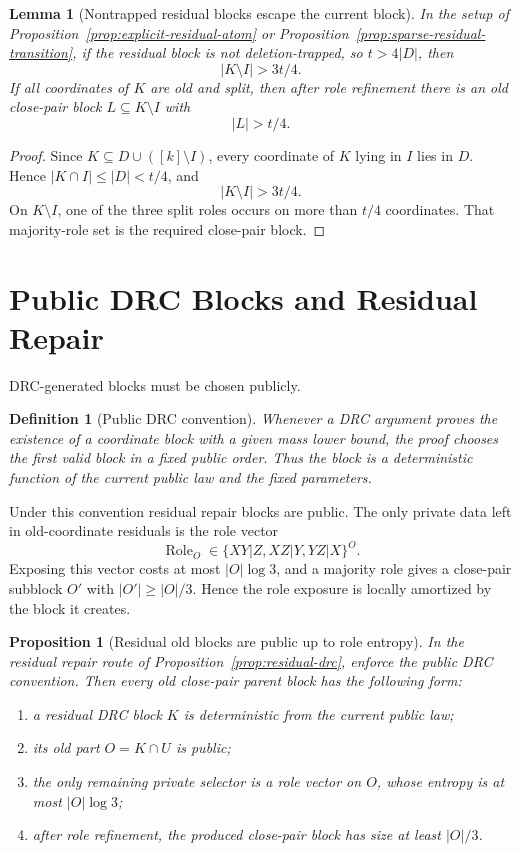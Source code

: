 \documentclass[11pt]{article}
\newtheorem{lemma}[theorem]{Lemma}
\newtheorem{proposition}[theorem]{Proposition}
\newtheorem{definition}[theorem]{Definition}
\begin{document}
\begin{lemma}[Nontrapped residual blocks escape the current block]
\label{lem:nontrapped-escape}
In the setup of Proposition~\ref{prop:explicit-residual-atom} or
Proposition~\ref{prop:sparse-residual-transition}, if the residual block is
not deletion-trapped, so $t>4|D|$, then
\[
  |K\setminus I|>3t/4.
\]
If all coordinates of $K$ are old and split, then after role refinement there
is an old close-pair block $L\subseteq K\setminus I$ with
\[
  |L|>t/4.
\]
\end{lemma}

\begin{proof}
Since $K\subseteq D\cup([k]\setminus I)$, every coordinate of $K$ lying in
$I$ lies in $D$.  Hence $|K\cap I|\le |D|<t/4$, and
\[
  |K\setminus I|>3t/4.
\]
On $K\setminus I$, one of the three split roles occurs on more than
$t/4$ coordinates.  That majority-role set is the required close-pair block.
\end{proof}

\section{Public DRC Blocks and Residual Repair}

DRC-generated blocks must be chosen publicly.

\begin{definition}[Public DRC convention]
\label{hyp:public-drc}
Whenever a DRC argument proves the existence of a coordinate block with a
given mass lower bound, the proof chooses the first valid block in a fixed
public order.  Thus the block is a deterministic function of the current
public law and the fixed parameters.
\end{definition}

Under this convention residual repair blocks are public.  The only private
data left in old-coordinate residuals is the role vector
\[
  \operatorname{Role}_O\in\{XY|Z,XZ|Y,YZ|X\}^O.
\]
Exposing this vector costs at most $|O|\log 3$, and a majority role gives a
close-pair subblock $O'$ with $|O'|\ge |O|/3$.  Hence the role exposure is
locally amortized by the block it creates.

\begin{proposition}[Residual old blocks are public up to role entropy]
\label{prop:residual-public}
In the residual repair route of Proposition~\ref{prop:residual-drc}, enforce
the public DRC convention.  Then every old close-pair parent block has the
following form:
\begin{enumerate}[label=\textup{(\roman*)}]
\item a residual DRC block $K$ is deterministic from the current public law;
\item its old part $O=K\cap U$ is public;
\item the only remaining private selector is a role vector on $O$, whose
entropy is at most $|O|\log 3$;
\item after role refinement, the produced close-pair block has size at least
 $|O|/3$.
\end{enumerate}
\end{proposition}
\end{document}
